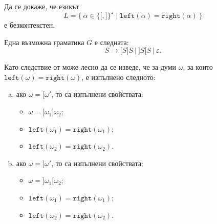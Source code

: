 \begin{framed}
  \begin{problem}
    Да се докаже, че езикът 
    \[L = \{\ \alpha \in \{\texttt{[}, \texttt{]}\}^\star\mid \texttt{left}(\alpha) = \texttt{right}(\alpha)\ \}\]
    е безконтекстен.
  \end{problem}  
\end{framed}
\begin{hint}
  \marginpar{  Алтернативна граматика за езика $L$ е
    \[S \to \varepsilon\ |\ \texttt{[}S\texttt{]}\ |\ \texttt{]}S\texttt{[}\ |\ SS.\]}
  Една възможна граматика $G$ е следната: 
  \[S \to \texttt{[}S\texttt{]}S\ |\ \texttt{]}S\texttt{[}S\ |\ \varepsilon.\]
  
  Като следствие от  може лесно да се изведе, че за думи $\omega$, за които $\texttt{left}(\omega) = \texttt{right}(\omega)$,
  е изпълнено следното:
  \begin{enumerate}[a)]
  \item 
    ако $\omega = \texttt{[}\omega'$, то са изпълнени свойствата:
    \begin{itemize}
    \item 
      $\omega = \texttt{[}\omega_1\texttt{]}\omega_2$;
    \item
      $\texttt{left}(\omega_1) = \texttt{right}(\omega_1)$;
    \item
      $\texttt{left}(\omega_2) = \texttt{right}(\omega_2)$.
    \end{itemize}
  \item
    ако $\omega = \texttt{]}\omega'$, то са изпълнени свойствата:
    \begin{itemize}
    \item 
      $\omega = \texttt{]}\omega_1\texttt{[}\omega_2$;
    \item
      $\texttt{left}(\omega_1) = \texttt{right}(\omega_1)$;
    \item
      $\texttt{left}(\omega_2) = \texttt{right}(\omega_2)$.
    \end{itemize}
  \end{enumerate}


\end{hint}
